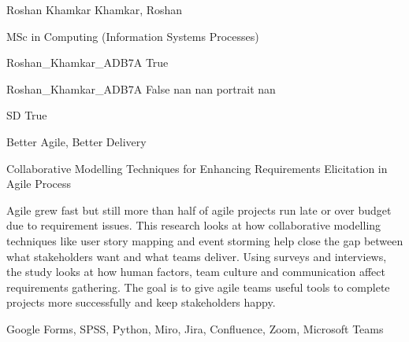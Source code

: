 
\begingroup{}\relax



\def\Key{Roshan_Khamkar_ADB7A}

{Roshan Khamkar}
{Khamkar, Roshan}

{MSc in Computing (Information Systems Processes)}

{Roshan_Khamkar_ADB7A}
{True}

{Roshan_Khamkar_ADB7A}
{False}
{nan}
{nan}
{portrait}
{nan}

{SD}
{True}

{Better Agile, Better Delivery}

{Collaborative Modelling Techniques for Enhancing Requirements Elicitation in Agile Process}

{Agile grew fast but still more than half of agile projects run late or over budget due to requirement issues. This research looks at how collaborative modelling techniques like user story mapping and event storming help close the gap between what stakeholders want and what teams deliver. Using surveys and interviews, the study looks at how human factors, team culture and communication affect requirements gathering. The goal is to give agile teams useful tools to complete projects more successfully and keep stakeholders happy.}

{Google Forms, SPSS, Python, Miro, Jira, Confluence, Zoom, Microsoft Teams}

